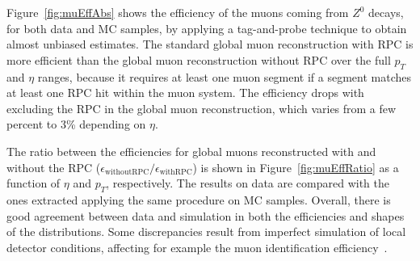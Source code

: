 \documentclass{JINST}
\begin{document}
Figure~\ref{fig:muEffAbs} shows
the efficiency of the muons coming from $Z^{0}$ decays, for both data and MC samples,
by applying a tag-and-probe technique to obtain almost unbiased estimates.
The standard global muon reconstruction with RPC is more efficient than the global muon reconstruction without RPC over the full $p_T$ and $\eta$ ranges, because it requires at least one muon segment if a segment matches at least one RPC hit within the muon system.
The efficiency drops with excluding the RPC in the global muon reconstruction, %
which varies from a few percent to 3\% depending on $\eta$. %

The ratio between the efficiencies for global muons reconstructed with and without the RPC ($\epsilon_{\mathrm{withoutRPC}}/\epsilon_{\mathrm{withRPC}}$) is shown in Figure~\ref{fig:muEffRatio}
as a function of $\eta$ and $p_T$, respectively.
The results on data are compared with the ones extracted applying the same procedure on MC samples.
Overall, there is good agreement between data and simulation in both the efficiencies and shapes of the distributions. Some discrepancies result from imperfect simulation of local detector conditions, affecting for example the muon identification efficiency~\cite{MUO-10-004}.
\end{document}

